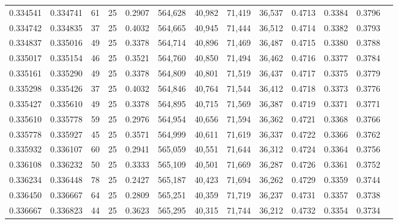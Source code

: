 \begin{tabular}{rrrrrrrrrrrrr}
0.334541 & 0.334741 &    61 &  25 &                                     0.2907 & 564,628 &  40,982 &  71,419 &  36,537 & 0.4713 & 0.3384 & 0.3796 \\
0.334742 & 0.334835 &    37 &  25 &                                     0.4032 & 564,665 &  40,945 &  71,444 &  36,512 & 0.4714 & 0.3382 & 0.3793 \\
0.334837 & 0.335016 &    49 &  25 &                                     0.3378 & 564,714 &  40,896 &  71,469 &  36,487 & 0.4715 & 0.3380 & 0.3788 \\
0.335017 & 0.335154 &    46 &  25 &                                     0.3521 & 564,760 &  40,850 &  71,494 &  36,462 & 0.4716 & 0.3377 & 0.3784 \\
0.335161 & 0.335290 &    49 &  25 &                                     0.3378 & 564,809 &  40,801 &  71,519 &  36,437 & 0.4717 & 0.3375 & 0.3779 \\
0.335298 & 0.335426 &    37 &  25 &                                     0.4032 & 564,846 &  40,764 &  71,544 &  36,412 & 0.4718 & 0.3373 & 0.3776 \\
0.335427 & 0.335610 &    49 &  25 &                                     0.3378 & 564,895 &  40,715 &  71,569 &  36,387 & 0.4719 & 0.3371 & 0.3771 \\
0.335610 & 0.335778 &    59 &  25 &                                     0.2976 & 564,954 &  40,656 &  71,594 &  36,362 & 0.4721 & 0.3368 & 0.3766 \\
0.335778 & 0.335927 &    45 &  25 &                                     0.3571 & 564,999 &  40,611 &  71,619 &  36,337 & 0.4722 & 0.3366 & 0.3762 \\
0.335932 & 0.336107 &    60 &  25 &                                     0.2941 & 565,059 &  40,551 &  71,644 &  36,312 & 0.4724 & 0.3364 & 0.3756 \\
0.336108 & 0.336232 &    50 &  25 &                                     0.3333 & 565,109 &  40,501 &  71,669 &  36,287 & 0.4726 & 0.3361 & 0.3752 \\
0.336234 & 0.336448 &    78 &  25 &                                     0.2427 & 565,187 &  40,423 &  71,694 &  36,262 & 0.4729 & 0.3359 & 0.3744 \\
0.336450 & 0.336667 &    64 &  25 &                                     0.2809 & 565,251 &  40,359 &  71,719 &  36,237 & 0.4731 & 0.3357 & 0.3738 \\
0.336667 & 0.336823 &    44 &  25 &                                     0.3623 & 565,295 &  40,315 &  71,744 &  36,212 & 0.4732 & 0.3354 & 0.3734 \\

\end{tabular}
